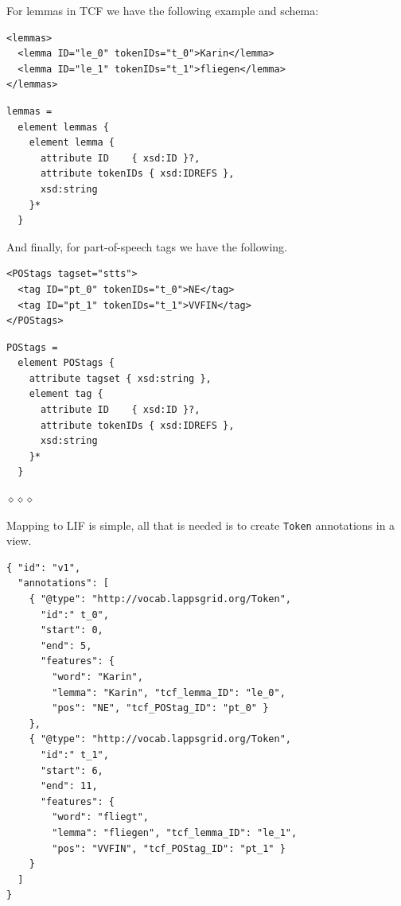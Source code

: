 \documentclass[11pt]{article}
\newcommand{\tag}[1]{{\tt #1}}
\newcommand{\sep}{
	\begin{center}
	$\diamond \diamond \diamond$
	\end{center}
}
\newenvironment{example}
    {\begin{tcolorbox}\small}
    {\end{tcolorbox}}
\begin{document}
For lemmas in TCF we have the following example and schema:

\begin{example}
\begin{verbatim}
<lemmas>
  <lemma ID="le_0" tokenIDs="t_0">Karin</lemma>
  <lemma ID="le_1" tokenIDs="t_1">fliegen</lemma>
</lemmas>
\end{verbatim}
\end{example}

\begin{example}
\begin{verbatim}
lemmas =
  element lemmas {
    element lemma {
      attribute ID    { xsd:ID }?,
      attribute tokenIDs { xsd:IDREFS },
      xsd:string
    }*
  }
\end{verbatim}
\end{example}


And finally, for part-of-speech tags we have the following.

\begin{example}
\begin{verbatim}
<POStags tagset="stts">
  <tag ID="pt_0" tokenIDs="t_0">NE</tag>
  <tag ID="pt_1" tokenIDs="t_1">VVFIN</tag>
</POStags>
\end{verbatim}
\end{example}

\begin{example}
\begin{verbatim}
POStags =
  element POStags {
    attribute tagset { xsd:string },
    element tag {
      attribute ID    { xsd:ID }?,
      attribute tokenIDs { xsd:IDREFS },
      xsd:string
    }*
  }
\end{verbatim}
\end{example}



\sep

Mapping to LIF is simple, all that is needed is to create \tag{Token} annotations in a view.

\begin{example}
\begin{verbatim}
{ "id": "v1",
  "annotations": [
    { "@type": "http://vocab.lappsgrid.org/Token",
      "id":" t_0",
      "start": 0,
      "end": 5,
      "features": { 
        "word": "Karin",
        "lemma": "Karin", "tcf_lemma_ID": "le_0",
        "pos": "NE", "tcf_POStag_ID": "pt_0" } 
    },
    { "@type": "http://vocab.lappsgrid.org/Token",
      "id":" t_1",
      "start": 6,
      "end": 11,
      "features": {
        "word": "fliegt",
        "lemma": "fliegen", "tcf_lemma_ID": "le_1",
        "pos": "VVFIN", "tcf_POStag_ID": "pt_1" } 
    }
  ]
}
\end{verbatim}
\end{example}
\end{document}
